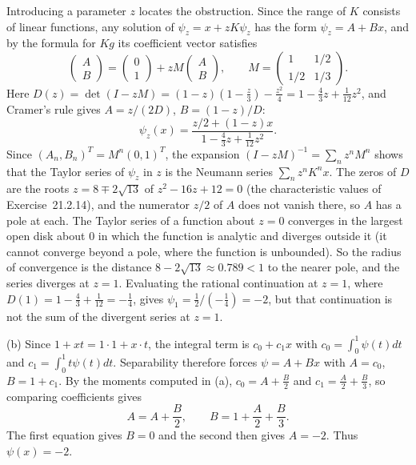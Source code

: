 Introducing a parameter $z$ locates the obstruction. Since the range of
$K$ consists of linear functions, any solution of $\psi_z=x+zK\psi_z$
has the form $\psi_z=A+Bx$, and by the formula for $Kg$ its
coefficient vector satisfies
\[
\begin{pmatrix}A\\B\end{pmatrix}
=\begin{pmatrix}0\\1\end{pmatrix}
+zM\begin{pmatrix}A\\B\end{pmatrix},\qquad
M=\begin{pmatrix}1&1/2\\1/2&1/3\end{pmatrix}.
\]
Here $D(z)=\det(I-zM)=(1-z)(1-\frac z3)-\frac{z^2}4
=1-\frac43z+\frac1{12}z^2$, and Cramer's rule gives
$A=z/(2D)$, $B=(1-z)/D$:
\[
\psi_z(x)=
\frac{z/2+(1-z)x}{1-\frac43z+\frac1{12}z^2}.
\]
Since $(A_n,B_n)^T=M^n(0,1)^T$, the expansion
$(I-zM)^{-1}=\sum_nz^nM^n$ shows that the Taylor series of $\psi_z$ in
$z$ is the Neumann series $\sum_nz^nK^nx$. The zeros of $D$ are the
roots $z=8\mp2\sqrt{13}$ of $z^2-16z+12=0$ (the characteristic values
of Exercise~21.2.14), and the numerator $z/2$ of $A$ does not vanish
there, so $A$ has a pole at each. The Taylor series of a function about
$z=0$ converges in the largest open disk about $0$ in which the function
is analytic and diverges outside it (it cannot converge beyond a pole,
where the function is unbounded). So the radius of convergence is the
distance $8-2\sqrt{13}\approx0.789<1$ to the nearer pole, and the
series diverges at $z=1$. Evaluating the rational
continuation at $z=1$, where $D(1)=1-\frac43+\frac1{12}=-\frac14$,
gives $\psi_1=\frac12/(-\frac14)=-2$, but that continuation is not
the sum of the divergent series at $z=1$.

(b) Since $1+xt=1\cdot1+x\cdot t$, the integral term is $c_0+c_1x$
with $c_0=\int_0^1\psi(t)dt$ and $c_1=\int_0^1t\psi(t)dt$.
Separability therefore forces $\psi=A+Bx$ with $A=c_0$, $B=1+c_1$.
By the moments computed in (a), $c_0=A+\frac B2$ and
$c_1=\frac A2+\frac B3$, so comparing coefficients gives
\[
A=A+\frac B2,\qquad
B=1+\frac A2+\frac B3.
\]
The first equation gives $B=0$ and the second then gives $A=-2$.
Thus $\boxed{\psi(x)=-2}$.


